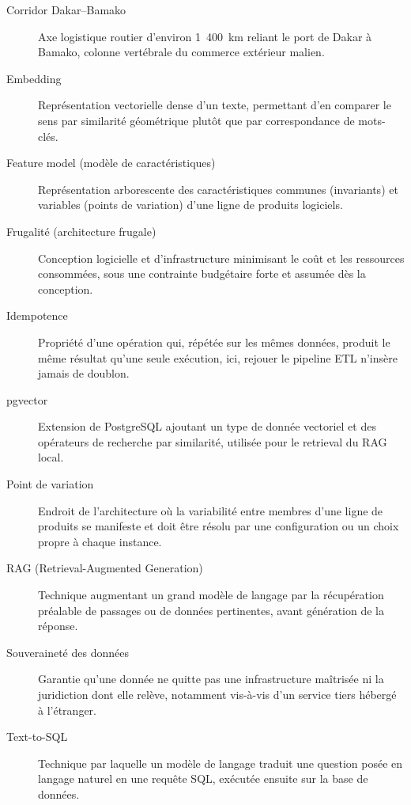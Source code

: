 \begin{description}
    \item[Corridor Dakar--Bamako] Axe logistique routier d'environ 1~400~km reliant le port de Dakar à Bamako, colonne vertébrale du commerce extérieur malien.
    \item[Embedding] Représentation vectorielle dense d'un texte, permettant d'en comparer le sens par similarité géométrique plutôt que par correspondance de mots-clés.
    \item[Feature model (modèle de caractéristiques)] Représentation arborescente des caractéristiques communes (invariants) et variables (points de variation) d'une ligne de produits logiciels.
    \item[Frugalité (architecture frugale)] Conception logicielle et d'infrastructure minimisant le coût et les ressources consommées, sous une contrainte budgétaire forte et assumée dès la conception.
    \item[Idempotence] Propriété d'une opération qui, répétée sur les mêmes données, produit le même résultat qu'une seule exécution, ici, rejouer le pipeline ETL n'insère jamais de doublon.
    \item[pgvector] Extension de PostgreSQL ajoutant un type de donnée vectoriel et des opérateurs de recherche par similarité, utilisée pour le retrieval du RAG local.
    \item[Point de variation] Endroit de l'architecture où la variabilité entre membres d'une ligne de produits se manifeste et doit être résolu par une configuration ou un choix propre à chaque instance.
    \item[RAG (Retrieval-Augmented Generation)] Technique augmentant un grand modèle de langage par la récupération préalable de passages ou de données pertinentes, avant génération de la réponse.
    \item[Souveraineté des données] Garantie qu'une donnée ne quitte pas une infrastructure maîtrisée ni la juridiction dont elle relève, notamment vis-à-vis d'un service tiers hébergé à l'étranger.
    \item[Text-to-SQL] Technique par laquelle un modèle de langage traduit une question posée en langage naturel en une requête SQL, exécutée ensuite sur la base de données.
\end{description}
